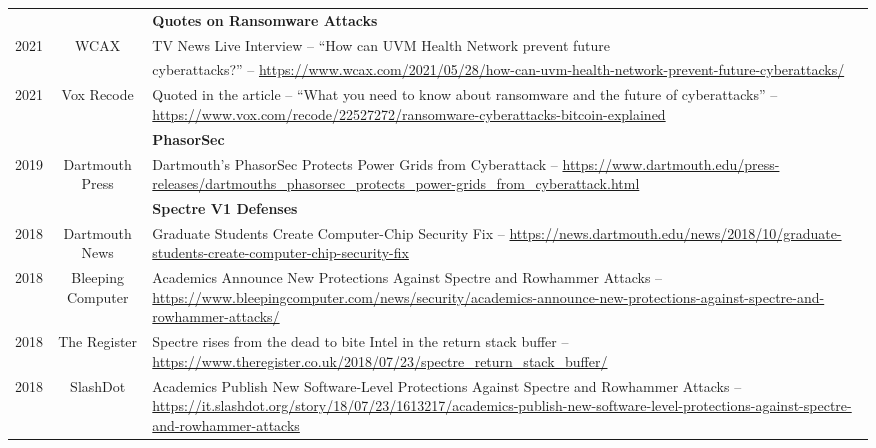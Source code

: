 \documentclass[letterpaper,10pt]{article}
\begin{document}
  \begin{tabularx}{\textwidth}{r c X}
   & & \textbf{Quotes on Ransomware Attacks} \\
     2021 & {\color{dartmouthgreen}WCAX} & TV News Live Interview -- ``How can UVM Health Network prevent future \\
     & & cyberattacks?'' -- \url{https://www.wcax.com/2021/05/28/how-can-uvm-health-network-prevent-future-cyberattacks/} \\
     2021 & {\color{dartmouthgreen}Vox Recode} & Quoted in the article -- ``What you need to know about ransomware and the future of cyberattacks'' -- \url{https://www.vox.com/recode/22527272/ransomware-cyberattacks-bitcoin-explained}\\
  & & \textbf{PhasorSec}\\
     2019 & {\color{dartmouthgreen}Dartmouth Press} &  Dartmouth’s PhasorSec Protects Power Grids from Cyberattack -- \url{https://www.dartmouth.edu/press-releases/dartmouths\_phasorsec\_protects\_power-grids\_from\_cyberattack.html} \\

  & & \textbf{Spectre V1 Defenses} \\
    2018 & {\color{dartmouthgreen}Dartmouth News} & Graduate Students Create Computer-Chip Security Fix -- \url{https://news.dartmouth.edu/news/2018/10/graduate-students-create-computer-chip-security-fix} \\
    2018 & {\color{dartmouthgreen}Bleeping Computer} & Academics Announce New Protections Against Spectre and Rowhammer Attacks -- \url{https://www.bleepingcomputer.com/news/security/academics-announce-new-protections-against-spectre-and-rowhammer-attacks/} \\
    2018 & {\color{dartmouthgreen}The Register} & Spectre rises from the dead to bite Intel in the return stack buffer -- \url{https://www.theregister.co.uk/2018/07/23/spectre\_return\_stack\_buffer/}\\
    2018 & {\color{dartmouthgreen}SlashDot} & Academics Publish New Software-Level Protections Against Spectre and Rowhammer Attacks -- \url{https://it.slashdot.org/story/18/07/23/1613217/academics-publish-new-software-level-protections-against-spectre-and-rowhammer-attacks} \\

\end{tabularx}



\vspace{0.5cm}
\end{document}
